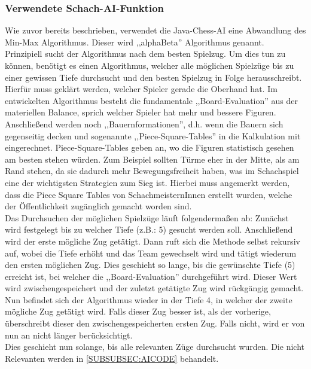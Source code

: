 \documentclass[12pt,a4paper]{article}
\begin{document}
\subsubsection{Verwendete Schach-AI-Funktion}
\label{SUBSUBSEC:OurAI}

Wie zuvor bereits beschrieben, verwendet die Java-Chess-AI eine Abwandlung des Min-Max Algorithmus. Dieser wird ,,alphaBeta'' Algorithmus genannt. \\
Prinzipiell sucht der Algorithmus nach dem besten Spielzug. Um dies tun zu können, benötigt es einen Algorithmus, welcher alle möglichen Spielzüge bis zu einer gewissen Tiefe durchsucht und den besten Spielzug in Folge herausschreibt. \\ 
Hierfür muss geklärt werden, welcher Spieler gerade die Oberhand hat. Im entwickelten Algorithmus besteht die fundamentale ,,Board-Evaluation'' aus der materiellen Balance, sprich welcher Spieler hat mehr und bessere Figuren. Anschließend werden noch  ,,Bauernformationen'', d.h. wenn die Bauern sich gegenseitig decken und sogenannte ,,Piece-Square-Tables'' in die Kalkulation mit eingerechnet. Piece-Square-Tables geben an, wo die Figuren statistisch gesehen am besten stehen würden. Zum Beispiel sollten Türme eher in der Mitte, als am Rand stehen, da sie dadurch mehr Bewegungsfreiheit haben, was im Schachspiel eine der wichtigsten Strategien zum Sieg ist. Hierbei muss angemerkt werden, dass die Piece Square Tables von SchachmeisternInnen erstellt wurden, welche der Öffentlichkeit zugänglich gemacht worden sind.\cite{SquareTables} \\[2ex]
Das Durchsuchen der möglichen Spielzüge läuft folgendermaßen ab: Zunächst wird festgelegt bis zu welcher Tiefe (z.B.: 5) gesucht werden soll. Anschließend wird der erste mögliche Zug getätigt. Dann ruft sich die Methode selbst rekursiv auf, wobei die Tiefe erhöht und das Team gewechselt wird und tätigt wiederum den ersten möglichen Zug. Dies geschieht so lange, bis die gewünschte Tiefe (5) erreicht ist, bei welcher die ,,Board-Evaluation'' durchgeführt wird. Dieser Wert wird zwischengespeichert und der zuletzt getätigte Zug wird rückgängig gemacht. \\
Nun befindet sich der Algorithmus wieder in der Tiefe 4, in welcher der zweite mögliche Zug getätigt wird. Falls dieser Zug besser ist, als der vorherige, überschreibt dieser den zwischengespeicherten ersten Zug. Falls nicht, wird er von nun an nicht länger berücksichtigt. \\
Dies geschieht nun solange, bis alle relevanten Züge durchsucht wurden. Die nicht Relevanten werden in \ref{SUBSUBSEC:AICODE} behandelt. \\
\end{document}

